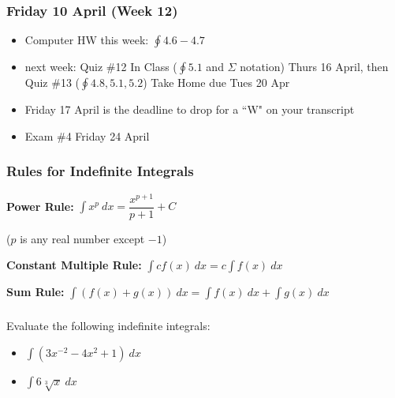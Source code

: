 \documentclass[14pt]{beamer}
\newcommand{\dint}{\displaystyle\int}
\begin{document}

\begin{frame}
\frametitle{Friday 10 April (Week 12)}
\small
\begin{itemize}
\item Computer HW this week: $\oint 4.6-4.7$ 	
\item next week: Quiz \#12 In Class ($\oint 5.1$ and $\Sigma$ notation) Thurs 16 April, then Quiz \#13 ($\oint 4.8, 5.1, 5.2$) Take Home due Tues 20 Apr
\item \alert{Friday 17 April is the deadline to drop for a ``W" on your transcript}
\item Exam \#4 Friday 24 April
\end{itemize}
\end{frame}

\begin{frame}
\frametitle{\small Rules for Indefinite Integrals}
\footnotesize
{\bf Power Rule:}  $\dint x^p\ dx = \dfrac{x^{p+1}}{p+1} + C$ 

\vspace{0.65pc}
\hspace{5ex}($p$ is any real number except $-1$) 

\vspace{1.5pc}
{\bf Constant Multiple Rule:} $\dint c f(x)\ dx = c \dint f(x)\ dx$

\vspace{1.5pc}
{\bf Sum Rule:} $\dint \left(f(x)+g(x) \right)\ dx = \dint f(x)\ dx + \dint g(x)\ dx$
\end{frame}

\begin{frame}%
\frametitle{}
\begin{exe} Evaluate the following indefinite integrals:

\begin{itemize}
\item $\dint \left( 3x^{-2}-4x^2+1 \right)\ dx$

\vspace{0.5pc}
\item $\dint 6 \sqrt[3]{x}\ dx$
\end{itemize}
\end{exe}
\end{frame}
\end{document}
